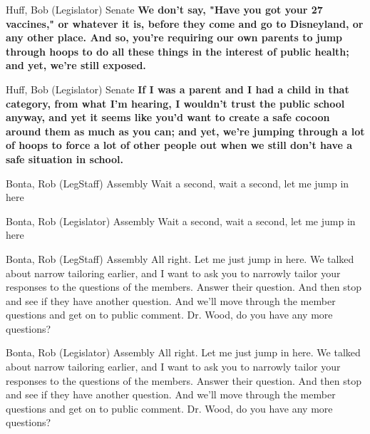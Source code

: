 \begin{result}{20.040584586913265}{Huff, Bob (Legislator) Senate}
\textbf{We don't say, "Have you got your 27 vaccines," or whatever it is, before they come and go to Disneyland, or any other place. And so, you're requiring our own parents to jump through hoops to do all these things in the interest of public health; and yet, we're still exposed.
}\end{result}

\begin{result}{15.249840257951574}{Huff, Bob (Legislator) Senate}
\textbf{If I was a parent and I had a child in that category, from what I'm hearing, I wouldn't trust the public school anyway, and yet it seems like you'd want to create a safe cocoon around them as much as you can; and yet, we're jumping through a lot of hoops to force a lot of other people out when we still don't have a safe situation in school.
}\end{result}

\begin{result}{7.7821422973482175}{Bonta, Rob (LegStaff) Assembly}
Wait a second, wait a second, let me jump in here
\end{result}

\begin{result}{7.7821422973482175}{Bonta, Rob (Legislator) Assembly}
Wait a second, wait a second, let me jump in here
\end{result}

\begin{result}{7.660613415956397}{Bonta, Rob (LegStaff) Assembly}
All right. Let me just jump in here. We talked about narrow tailoring earlier, and I want to ask you to narrowly tailor your responses to the questions of the members. Answer their question. And then stop and see if they have another question. And we'll move through the member questions and get on to public comment. Dr. Wood, do you have any more questions?
\end{result}

\begin{result}{7.660613415956397}{Bonta, Rob (Legislator) Assembly}
All right. Let me just jump in here. We talked about narrow tailoring earlier, and I want to ask you to narrowly tailor your responses to the questions of the members. Answer their question. And then stop and see if they have another question. And we'll move through the member questions and get on to public comment. Dr. Wood, do you have any more questions?
\end{result}

